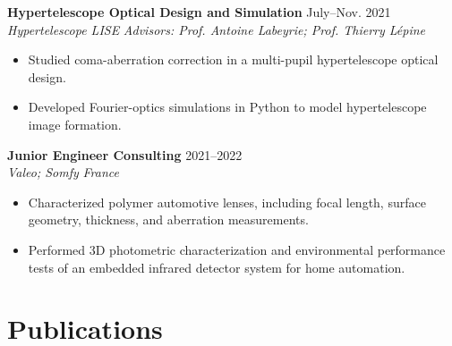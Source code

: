 \documentclass[11pt,letterpaper]{article}
\newcommand{\cvheading}[4]{%
  \textbf{#1} \hfill #2\\
  \textit{#3} \hfill \textit{#4}\par
}
\begin{document}
\cvheading{Hypertelescope Optical Design and Simulation}{July--Nov. 2021}{Hypertelescope LISE}{Advisors: Prof. Antoine Labeyrie; Prof. Thierry L\'epine}
\begin{itemize}
  \item Studied coma-aberration correction in a multi-pupil hypertelescope optical design.
  \item Developed Fourier-optics simulations in Python to model hypertelescope image formation.
\end{itemize}

\cvheading{Junior Engineer Consulting}{2021--2022}{Valeo; Somfy}{France}
\begin{itemize}
  \item Characterized polymer automotive lenses, including focal length, surface geometry, thickness, and aberration measurements.
  \item Performed 3D photometric characterization and environmental performance tests of an embedded infrared detector system for home automation.
\end{itemize}









\section{Publications}
\end{document}
